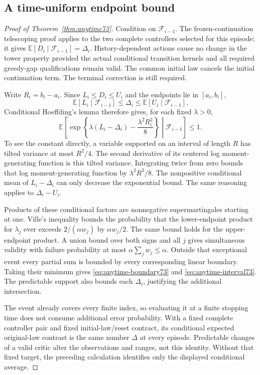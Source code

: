 \subsection{A time-uniform endpoint bound}\label{supp:anytime73}
\begin{proof}[Proof of Theorem~\ref{thm:anytime73}]
Condition on $\mathcal F_{i-1}$. The frozen-continuation telescoping proof applies to the two complete controllers selected for this episode; it gives $\mathbb E[D_i\mid\mathcal F_{i-1}]=\Delta_i$. History-dependent actions cause no change in the tower property provided the actual conditional transition kernels and all required greedy-gap qualifications remain valid. The common initial law cancels the initial continuation term. The terminal correction is still required.

Write $R_i=b_i-a_i$. Since $L_i\le D_i\le U_i$ and the endpoints lie in $[a_i,b_i]$,
\[
 \mathbb E[L_i\mid\mathcal F_{i-1}]\le\Delta_i
       \le\mathbb E[U_i\mid\mathcal F_{i-1}].
\]
Conditional Hoeffding's lemma therefore gives, for each fixed $\lambda>0$,
\[
 \mathbb E\!\left[
   \exp\!\left\{\lambda(L_i-\Delta_i)-\frac{\lambda^2R_i^2}{8}\right\}
                    \middle|\mathcal F_{i-1}\right]\le1.
\]
To see the constant directly, a variable supported on an interval of length $R$ has tilted variance at most $R^2/4$. The second derivative of its centered log moment-generating function is this tilted variance. Integrating twice from zero bounds that log moment-generating function by $\lambda^2R^2/8$. The nonpositive conditional mean of $L_i-\Delta_i$ can only decrease the exponential bound. The same reasoning applies to $\Delta_i-U_i$.

Products of these conditional factors are nonnegative supermartingales starting at one. Ville's inequality bounds the probability that the lower-endpoint product for $\lambda_j$ ever exceeds $2/(\alpha w_j)$ by $\alpha w_j/2$. The same bound holds for the upper-endpoint product. A union bound over both signs and all $j$ gives simultaneous validity with failure probability at most $\alpha\sum_jw_j\le\alpha$. Outside that exceptional event every partial sum is bounded by every corresponding linear boundary. Taking their minimum gives \eqref{eq:anytime-boundary73} and \eqref{eq:anytime-interval73}. The predictable support also bounds each $\Delta_i$, justifying the additional intersection.

The event already covers every finite index, so evaluating it at a finite stopping time does not consume additional error probability. With a fixed complete controller pair and fixed initial-law/reset contract, its conditional expected original-law contrast is the same number $\Delta$ at every episode. Predictable changes of a valid critic alter the observations and ranges, not this identity. Without that fixed target, the preceding calculation identifies only the displayed conditional average.
\end{proof}

